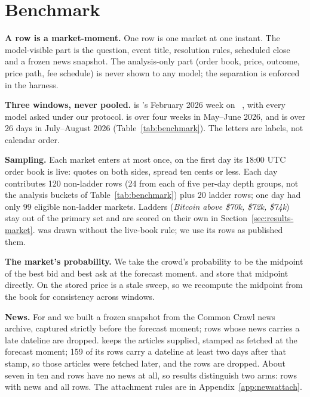 \section{Benchmark}
\label{sec:benchmark}

\textbf{A row is a market-moment.} One row is one market at one instant. The
model-visible part is the question, event title, resolution rules, scheduled close
and a frozen news snapshot. The analysis-only part (order book, price, outcome,
price path, fee schedule) is never shown to any model; the separation is enforced
in the harness.

\textbf{Three windows, never pooled.} \winA is \polybench's February 2026 week on
\polymarket~\citep{cheng2026polybench}, with every model asked under our protocol. \winC is
\kalshi over four weeks in May--June 2026, and \winB is \polymarket over 26
days in July--August 2026 (Table~\ref{tab:benchmark}). The letters are labels, not calendar order.

\textbf{Sampling.} Each market enters at most once, on the first day its 18:00
UTC order book is live: quotes on both sides, spread ten cents or less. Each day contributes 120
non-ladder rows (24 from each of five per-day depth groups, not the analysis
buckets of Table~\ref{tab:benchmark}) plus 20 ladder rows; one \winB day had
only 99 eligible non-ladder markets.
Ladders (\emph{Bitcoin above \$70k, \$72k, \$74k}) stay out of the primary set and are scored on their own in
Section~\ref{sec:results-market}.
\winA was drawn without the live-book rule; we use its rows as \polybench
published them.

\textbf{The market's probability.} We take the crowd's probability to be the
midpoint of the best bid and best ask at the forecast moment. \winB and \winC
store that midpoint directly. On \winA the stored price is a stale sweep, so we
recompute the midpoint from the book for consistency across windows.

\textbf{News.} For \winB and \winC we built a frozen snapshot from the Common
Crawl news archive, captured strictly before the forecast moment; rows whose
news carries a late dateline are dropped. \winA keeps the articles \polybench
supplied, stamped as fetched at the forecast moment; 159 of its rows carry a
dateline at least two days after that stamp, so those articles were fetched
later, and the rows are dropped. About seven in ten \winB and \winC rows have no
news at all, so results distinguish two arms: rows with news and all rows. The attachment rules are in
Appendix~\ref{app:newsattach}.

